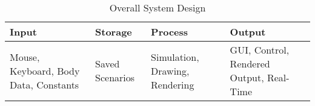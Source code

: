 \begin{table}[htbp]
\caption{Overall System Design}
\centering
\footnotesize
\def\arraystretch{1.5}
\begin{tabular}{|P{3cm}|P{3cm}|P{3cm}|P{3cm}|}
\hline 
\textbf{Input} & \textbf{Storage} & \textbf{Process} & \textbf{Output}  \\
\hline
Mouse, Keyboard, Body Data, Constants & Saved Scenarios & Simulation, Drawing, Rendering & GUI, Control, Rendered Output, Real-Time \\
\hline
\end{tabular}
\end{table} 